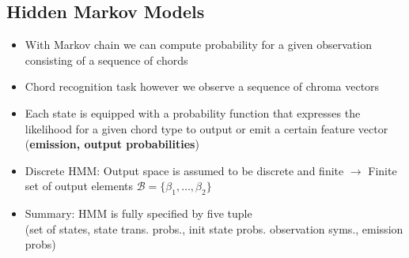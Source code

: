 \documentclass{scrartcl}
\begin{document}
\subsection*{Hidden Markov Models}
\begin{itemize}
    \item
        With Markov chain we can compute probability for a given observation consisting of a sequence of chords
    \item
        Chord recognition task however we observe a sequence of chroma vectors
    \item
        Each state is equipped with a probability function that expresses the likelihood for a given chord type to output or emit a certain feature vector (\textbf{emission, output probabilities})
    \item
        Discrete HMM: Output space is assumed to be discrete and finite $\rightarrow$ Finite set of output elements $\mathcal{B} = \{\beta_1, \dots, \beta_2\}$
    \item
        Summary: HMM is fully specified by five tuple\\ (set of states, state trans. probs., init state probs. observation syms., emission probs)
\end{itemize}
\end{document}
